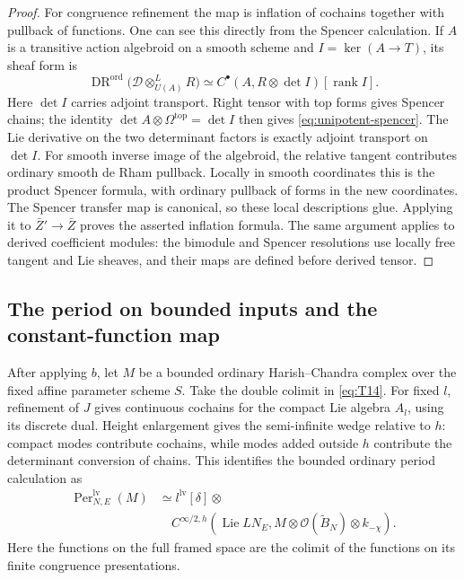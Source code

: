 \begin{proof}
For congruence refinement the map is inflation of cochains together
with pullback of functions.  One can see this directly from the
Spencer calculation.  If $A$ is a transitive action algebroid on a
smooth scheme and $I=\ker(A\to T)$, its sheaf form is
\begin{equation}\label{eq:unipotent-spencer}
 \operatorname{DR}^{\mathrm{ord}}
   \bigl(\mathscr D\otimes^L_{U(A)}R\bigr)
 \simeq C^\bullet(A,R\otimes\det I)
                           [\operatorname{rank}I].
\end{equation}
Here $\det I$ carries adjoint transport.  Right tensor with top
forms gives Spencer chains; the identity
$\det A\otimes\Omega^{\mathrm{top}}=\det I$ then gives
\eqref{eq:unipotent-spencer}.  The Lie derivative on the two
determinant factors is exactly adjoint transport on $\det I$.
For smooth inverse image of the algebroid, the relative tangent
contributes ordinary smooth de Rham pullback.  Locally in smooth
coordinates this is the product Spencer formula, with ordinary
pullback of forms in the new coordinates.  The Spencer transfer
map is canonical, so these local descriptions glue.  Applying it
to $\bar Z'\to\bar Z$ proves the asserted inflation formula.
The same argument applies to derived coefficient modules: the
bimodule and Spencer resolutions use locally free tangent and Lie
sheaves, and their maps are defined before derived tensor.
\end{proof}

\subsection{The period on bounded inputs and the constant-function map}

After applying $b$, let $M$ be a bounded ordinary Harish--Chandra
complex over the fixed affine parameter scheme $S$.  Take the
double colimit in \eqref{eq:T14}.  For fixed $l$, refinement
of $J$ gives continuous cochains for the compact Lie algebra $A_l$,
using its discrete dual.  Height enlargement gives the semi-infinite
wedge relative to $h$: compact modes contribute cochains, while
modes added outside $h$ contribute the determinant conversion of
chains.  This identifies the bounded ordinary period calculation as
\begin{equation}\label{eq:unipotent-coefficient-period}
 \begin{aligned}
 \operatorname{Per}_{N,E}^{\mathrm{lv}}(M)
 &\simeq l^{\mathrm{lv}}[\delta]\otimes{}\\
 &\quad C^{\infty/2,h}\!\left(
   \operatorname{Lie}LN_E,
   M\otimes\mathcal O(\widetilde B_N)\otimes k_{-\chi}\right).
 \end{aligned}
\end{equation}
Here the functions on the full framed space are the colimit of the
functions on its finite congruence presentations.

